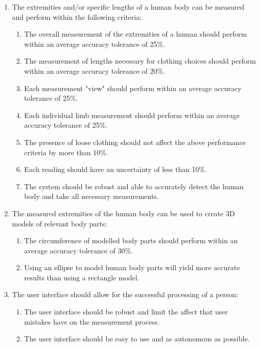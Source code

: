 \begin{enumerate}
	\item The extremities and/or specific lengths of a human body can be measured and perform within the following criteria:
	\begin{enumerate}
		\item The overall measurement of the extremities of a human should perform within an average accuracy tolerance of 25\%.
		\item The measurement of lengths necessary for clothing choices should perform within an average accuracy tolerance of 20\%.
		\item Each measurement "view" should perform within an average accuracy tolerance of 25\%.
		\item Each individual limb measurement should perform within an average accuracy tolerance of 25\%.
		\item The presence of loose clothing should not affect the above performance criteria by more than 10\%.
		\item Each reading should have an uncertainty of less than 10\%.
		\item The system should be robust and able to accurately detect the human body and take all necessary measurements. 
	\end{enumerate}
	\item The measured extremities of the human body can be used to create 3D models of relevant body parts: 
	\begin{enumerate}
		\item The circumference of modelled body parts should perform within an average accuracy tolerance of 30\%.
		\item Using an ellipse to model human body parts will yield more accurate results than using a rectangle model. 
	\end{enumerate}
	\item The user interface should allow for the successful processing of a person: 
	\begin{enumerate}
		\item The user interface should be robust and limit the affect that user mistakes have on the measurement process.
		\item The user interface should be easy to use and as autonomous as possible.
	\end{enumerate}
\end{enumerate}
